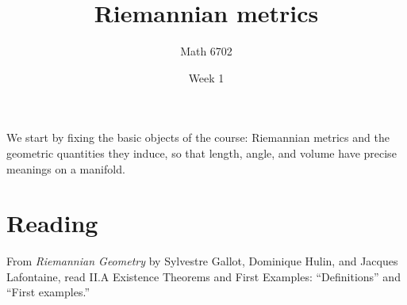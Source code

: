 \documentclass{article}
\title{Riemannian metrics}
\author{Math 6702}
\date{Week 1}
\begin{document}
\maketitle

We start by fixing the basic objects of the course: Riemannian metrics and the geometric quantities they induce, so that length, angle, and volume have precise meanings on a manifold.

\section*{Reading}
From \textit{Riemannian Geometry} by Sylvestre Gallot, Dominique Hulin, and Jacques Lafontaine, read \textsection II.A Existence Theorems and First Examples: ``Definitions'' and ``First examples.''
\end{document}
